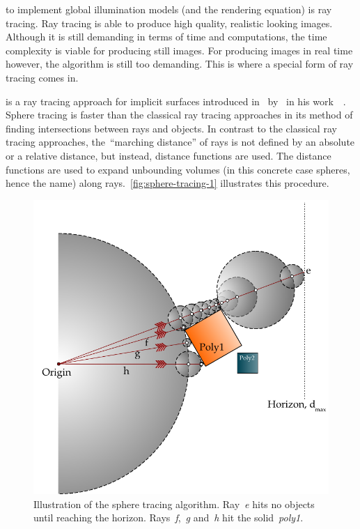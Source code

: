 \documentclass[%
    a4paper,    %
    justified,  %
    nobib,      %
    openany     %
]{tufte-book}
\begin{document}
 to implement global illumination models (and
the rendering equation) is ray tracing. Ray tracing is able to produce high
quality, realistic looking images. Although it is still demanding in terms of
time and computations, the time complexity is viable for producing still
images. For producing images in real time however, the algorithm is still too
demanding. This is where a special form of ray tracing comes in.

 is a ray tracing approach for implicit surfaces
introduced in~\citeyear{hart_sphere_1994} by~\citeauthor{hart_sphere_1994} in
his work~~\cite{hart_sphere_1994}. 
Sphere tracing is faster than the classical ray tracing approaches in its method
of finding
intersections between rays and objects. In contrast to the classical ray tracing
approaches, the~\enquote{marching distance} of rays is not defined by an absolute or a
relative distance, but instead, distance functions are used. The distance functions
are used to expand unbounding volumes (in this concrete case spheres, hence the
name) along rays.~\autoref{fig:sphere-tracing-1} illustrates this procedure.

\begin{figure}[h]
    \centering
    \includegraphics[width=0.75\linewidth]{images/sphere-tracing-principle}
    \caption{Illustration of the sphere tracing
      algorithm.
      Ray~\textit{e} hits no objects until reaching the horizon.
      Rays~\textit{f},~\textit{g} and~\textit{h} hit
      the solid~\textit{poly1}.}
      \label{fig:sphere-tracing-1}
\end{figure}
\end{document}
